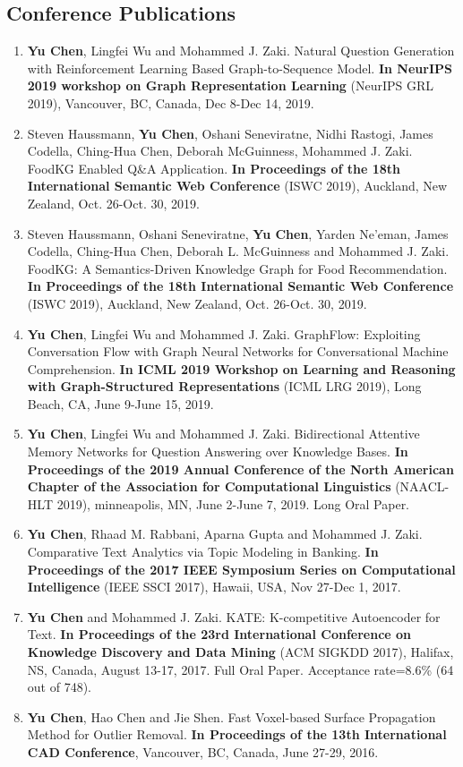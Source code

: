 \documentclass[11pt,a4paper,sans]{moderncv} %
\begin{document}
\subsection{Conference Publications}
{\footnotesize 
\begin{enumerate}

\item \textbf{Yu Chen}, Lingfei Wu and Mohammed J. Zaki. Natural Question Generation with Reinforcement Learning Based Graph-to-Sequence Model. \textbf{In NeurIPS 2019 workshop on Graph Representation Learning} (NeurIPS GRL 2019), Vancouver, BC, Canada, Dec 8-Dec 14, 2019. 
\item Steven Haussmann, \textbf{Yu Chen}, Oshani Seneviratne, Nidhi Rastogi, James Codella, Ching-Hua Chen, Deborah McGuinness, Mohammed J. Zaki. FoodKG Enabled Q\&A Application. \textbf{In Proceedings of the 18th International Semantic Web Conference} (ISWC 2019), Auckland, New Zealand, Oct. 26-Oct. 30, 2019.
\item Steven Haussmann, Oshani Seneviratne, \textbf{Yu Chen}, Yarden Ne’eman, James Codella, Ching-Hua Chen, Deborah L. McGuinness and Mohammed J. Zaki. FoodKG: A Semantics-Driven Knowledge Graph for Food Recommendation. \textbf{In Proceedings of the 18th International Semantic Web Conference} (ISWC 2019), Auckland, New Zealand, Oct. 26-Oct. 30, 2019. 
\item \textbf{Yu Chen}, Lingfei Wu and Mohammed J. Zaki. GraphFlow: Exploiting Conversation Flow with Graph Neural Networks for Conversational Machine Comprehension. \textbf{In ICML 2019 Workshop on Learning and Reasoning with Graph-Structured Representations} (ICML LRG 2019), Long Beach, CA, June 9-June 15, 2019. 
\item \textbf{Yu Chen}, Lingfei Wu and Mohammed J. Zaki. Bidirectional Attentive Memory Networks for Question Answering over Knowledge Bases. \textbf{In Proceedings of the 2019 Annual Conference of the North American Chapter of the Association for Computational Linguistics} (NAACL-HLT 2019), minneapolis, MN, June 2-June 7, 2019. Long Oral Paper.
\item \textbf{Yu Chen}, Rhaad M. Rabbani, Aparna Gupta and Mohammed J. Zaki. Comparative Text Analytics via Topic Modeling in Banking. \textbf{In Proceedings of the 2017 IEEE Symposium Series on Computational Intelligence} (IEEE SSCI 2017), Hawaii, USA, Nov 27-Dec 1, 2017.
\item \textbf{Yu Chen} and Mohammed J. Zaki. KATE: K-competitive Autoencoder for Text. \textbf{In Proceedings of the 23rd International Conference on Knowledge Discovery and Data Mining} (ACM SIGKDD 2017), Halifax, NS, Canada, August 13-17, 2017. Full Oral Paper. Acceptance rate=8.6\% (64 out of 748). 
\item \textbf{Yu Chen}, Hao Chen and Jie Shen. Fast Voxel-based Surface Propagation Method for Outlier Removal. \textbf{In Proceedings of the 13th International CAD Conference}, Vancouver, BC, Canada, June 27-29, 2016.
\end{enumerate}
}
\end{document}
